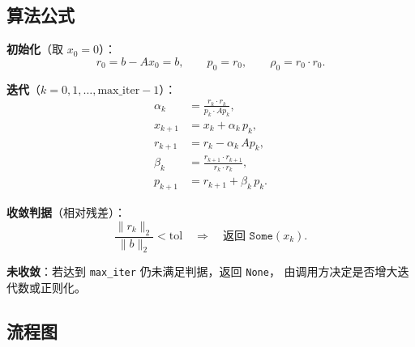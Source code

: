 \documentclass[11pt,a4paper]{article}
\begin{document}
\subsection{算法公式}

\textbf{初始化}（取 $x_0 = 0$）：
\[
  r_0 = b - A x_0 = b,\qquad p_0 = r_0,\qquad \rho_0 = r_0 \cdot r_0.
\]

\textbf{迭代}（$k = 0, 1, \dots, \text{max\_iter}-1$）：
\begin{align}
  \alpha_k &= \frac{r_k \cdot r_k}{p_k \cdot A p_k}, \\
  x_{k+1}  &= x_k + \alpha_k\, p_k, \\
  r_{k+1}  &= r_k - \alpha_k\, A p_k, \\
  \beta_k  &= \frac{r_{k+1} \cdot r_{k+1}}{r_k \cdot r_k}, \\
  p_{k+1}  &= r_{k+1} + \beta_k\, p_k.
\end{align}

\textbf{收敛判据}（相对残差）：
\[
  \frac{\|r_k\|_2}{\|b\|_2} < \text{tol} \quad\Rightarrow\quad \text{返回 } \texttt{Some}(x_k).
\]

\textbf{未收敛}：若达到 \texttt{max\_iter} 仍未满足判据，返回 \texttt{None}，
由调用方决定是否增大迭代数或正则化。

\subsection{流程图}
\end{document}
